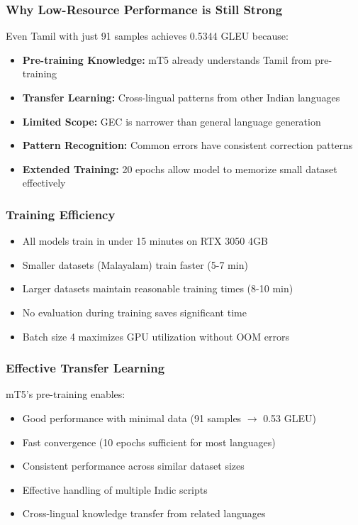 \documentclass[12pt,a4paper]{article}
\begin{document}
\subsubsection{Why Low-Resource Performance is Still Strong}

Even Tamil with just 91 samples achieves 0.5344 GLEU because:
\begin{itemize}
    \item \textbf{Pre-training Knowledge:} mT5 already understands Tamil from pre-training
    \item \textbf{Transfer Learning:} Cross-lingual patterns from other Indian languages
    \item \textbf{Limited Scope:} GEC is narrower than general language generation
    \item \textbf{Pattern Recognition:} Common errors have consistent correction patterns
    \item \textbf{Extended Training:} 20 epochs allow model to memorize small dataset effectively
\end{itemize}

\subsubsection{Training Efficiency}
\begin{itemize}
    \item All models train in under 15 minutes on RTX 3050 4GB
    \item Smaller datasets (Malayalam) train faster (5-7 min)
    \item Larger datasets maintain reasonable training times (8-10 min)
    \item No evaluation during training saves significant time
    \item Batch size 4 maximizes GPU utilization without OOM errors
\end{itemize}

\subsubsection{Effective Transfer Learning}
mT5's pre-training enables:
\begin{itemize}
    \item Good performance with minimal data (91 samples $\rightarrow$ 0.53 GLEU)
    \item Fast convergence (10 epochs sufficient for most languages)
    \item Consistent performance across similar dataset sizes
    \item Effective handling of multiple Indic scripts
    \item Cross-lingual knowledge transfer from related languages
\end{itemize}
\end{document}
